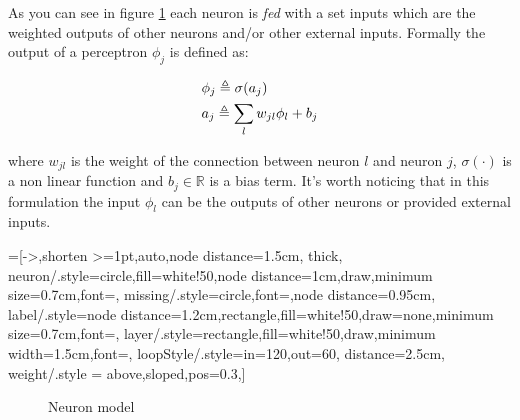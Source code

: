 As you can see in figure \ref{neuron_model} each neuron is \textit{fed} with a set inputs which are the weighted outputs of other neurons and/or other external inputs.
Formally the output of a perceptron $\phi_j$
is defined as:
 
\begin{align}
&\phi_j \triangleq \sigma(a_j)\label{def_perceptron_1}\\
&a_j \triangleq \sum_l w_{jl}\phi_l +b_j \label{def_perceptron_2}
\end{align}

where $w_{jl}$ is the weight of the connection between neuron $l$ and neuron $j$, $\sigma(\cdot)$ is a non linear function and $b_j \in \mathbb{R}$ is a bias term.
It's worth noticing that in this formulation the input $\phi_l$ can be the outputs of other neurons or provided external inputs.


=[->,shorten >=1pt,auto,node distance=1.5cm,
  thick,
  neuron/.style={circle,fill=white!50,node distance=1cm,draw,minimum size=0.7cm,font=\sffamily\normalsize},
  missing/.style={circle,font=\sffamily\Large,node distance=0.95cm},
  label/.style={node distance=1.2cm,rectangle,fill=white!50,draw=none,minimum size=0.7cm,font=\sffamily\normalsize},
  layer/.style={rectangle,fill=white!50,draw,minimum width=1.5cm,font=\sffamily\Large},
  loopStyle/.style={in=120,out=60, distance=2.5cm},
  weight/.style = {above,sloped,pos=0.3},]
\begin{figure}[h]
 \centering
{}
\caption{Neuron model}
\label{neuron_model}
\end{figure}

